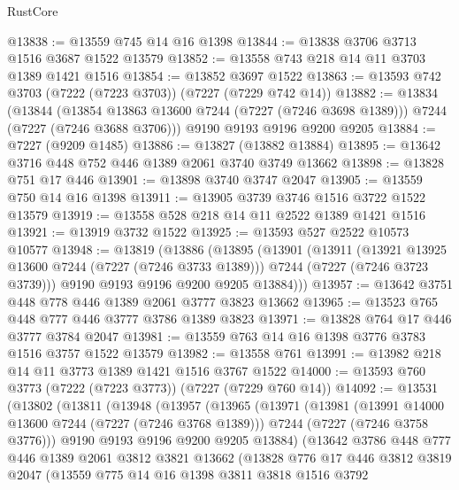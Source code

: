 \begin{lexlean}{RustCore}
\begin{coremodule}
@13838 := @13559 @745 @14 @16 @1398
@13844 := @13838 @3706 @3713 @1516 @3687 @1522 @13579
@13852 := @13558 @743 @218 @14 @11 @3703 @1389 @1421 @1516
@13854 := @13852 @3697 @1522
@13863 := @13593 @742 @3703 (@7222 (@7223 @3703)) (@7227 (@7229 @742 @14))
@13882 := @13834
    (@13844
      (@13854 @13863 @13600 @7244 (@7227 (@7246 @3698 @1389)))
      @7244
      (@7227 (@7246 @3688 @3706)))
    @9190
    @9193
    @9196
    @9200
    @9205
@13884 := @7227 (@9209 @1485)
@13886 := @13827 (@13882 @13884)
@13895 := @13642 @3716 @448 @752 @446 @1389 @2061 @3740 @3749 @13662
@13898 := @13828 @751 @17 @446
@13901 := @13898 @3740 @3747 @2047
@13905 := @13559 @750 @14 @16 @1398
@13911 := @13905 @3739 @3746 @1516 @3722 @1522 @13579
@13919 := @13558 @528 @218 @14 @11 @2522 @1389 @1421 @1516
@13921 := @13919 @3732 @1522
@13925 := @13593 @527 @2522 @10573 @10577
@13948 := @13819
    (@13886
      (@13895
        (@13901
          (@13911
            (@13921 @13925 @13600 @7244 (@7227 (@7246 @3733 @1389)))
            @7244
            (@7227 (@7246 @3723 @3739)))
          @9190
          @9193
          @9196
          @9200
          @9205
          @13884)))
@13957 := @13642 @3751 @448 @778 @446 @1389 @2061 @3777 @3823 @13662
@13965 := @13523 @765 @448 @777 @446 @3777 @3786 @1389 @3823
@13971 := @13828 @764 @17 @446 @3777 @3784 @2047
@13981 := @13559 @763 @14 @16 @1398 @3776 @3783 @1516 @3757 @1522 @13579
@13982 := @13558 @761
@13991 := @13982 @218 @14 @11 @3773 @1389 @1421 @1516 @3767 @1522
@14000 := @13593 @760 @3773 (@7222 (@7223 @3773)) (@7227 (@7229 @760 @14))
@14092 := @13531
    (@13802
      (@13811
        (@13948
          (@13957
            (@13965
              (@13971
                (@13981
                  (@13991 @14000 @13600 @7244 (@7227 (@7246 @3768 @1389)))
                  @7244
                  (@7227 (@7246 @3758 @3776)))
                @9190
                @9193
                @9196
                @9200
                @9205
                @13884)
              (@13642
                @3786
                @448
                @777
                @446
                @1389
                @2061
                @3812
                @3821
                @13662
                (@13828
                  @776
                  @17
                  @446
                  @3812
                  @3819
                  @2047
                  (@13559
                    @775
                    @14
                    @16
                    @1398
                    @3811
                    @3818
                    @1516
                    @3792

\end{coremodule}
\end{lexlean}
